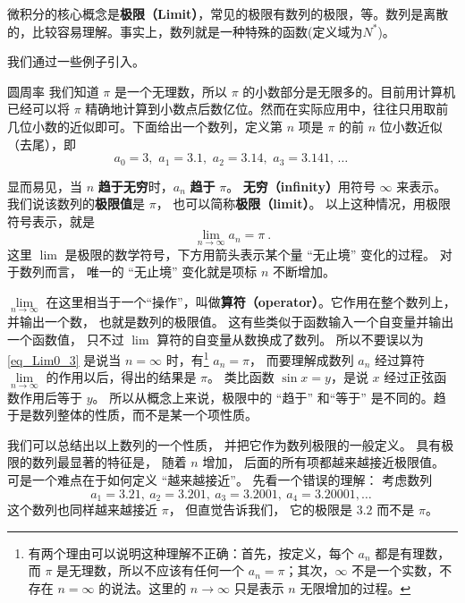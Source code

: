 
微积分的核心概念是\textbf{极限（Limit）}，常见的极限有数列的极限，等。数列是离散的，比较容易理解。事实上，数列就是一种特殊的函数(定义域为$N^{*}$)。

我们通过一些例子引入。

\begin{example}{圆周率}\label{ex_Lim0_1}
我们知道 $\pi$ 是一个无理数，所以 $\pi$ 的小数部分是无限多的。目前用计算机已经可以将 $\pi$ 精确地计算到小数点后数亿位。然而在实际应用中，往往只用取前几位小数的近似即可。下面给出一个数列，定义第 $n$ 项是 $\pi$ 的前 $n$ 位小数近似（去尾），即
\begin{equation}\label{eq_Lim0_1}
a_0 = 3,\,\, a_1 = 3.1,\,\, a_2 = 3.14,\,\, a_3 = 3.141,\,\dots~
\end{equation}

显而易见，当 $n$ \textbf{趋于无穷}时，$a_n$ \textbf{趋于} $\pi$。 \textbf{无穷（infinity）}用符号 $\infty$ 来表示。 我们说该数列的\textbf{极限值}是 $\pi$， 也可以简称\textbf{极限（limit）}。 以上这种情况，用极限符号表示，就是
\begin{equation}\label{eq_Lim0_3}
\lim_{n \to \infty } {a_n} = \pi ~.
\end{equation}
这里 $\lim$ 是极限的数学符号，下方用箭头表示某个量 “无止境” 变化的过程。 对于数列而言， 唯一的 “无止境” 变化就是项标 $n$ 不断增加。%
\end{example}



$\lim\limits_{n \to \infty }$ 在这里相当于一个“操作”，叫做\textbf{算符（operator）}。它作用在整个数列上，并输出一个数， 也就是数列的极限值。 这有些类似于函数输入一个自变量并输出一个函数值， 只不过 $\lim$ 算符的自变量从数换成了数列。 所以不要误以为\autoref{eq_Lim0_3} 是说当 $n = \infty$ 时，有\footnote{有两个理由可以说明这种理解不正确：首先，按定义，每个 $a_n$ 都是有理数，而 $\pi$ 是无理数，所以不应该有任何一个 $a_n=\pi$；其次，$\infty$ 不是一个实数，不存在 $n=\infty$ 的说法。这里的 $n\to\infty$ 只是表示 $n$ 无限增加的过程。} $a_n=\pi$， 而要理解成数列 $a_n$ 经过算符 $\lim\limits_{n \to \infty }$ 的作用以后，得出的结果是 $\pi$。 类比函数 $\sin x = y$，是说 $x$ 经过正弦函数作用后等于 $y$。 所以从概念上来说，极限中的 “趋于” 和“等于” 是不同的。趋于是数列整体的性质，而不是某一个项性质。

我们可以总结出以上数列的一个性质， 并把它作为数列极限的一般定义。 具有极限的数列最显著的特征是， 随着 $n$ 增加， 后面的所有项都越来越接近极限值。 可是一个难点在于如何定义 “越来越接近”。 先看一个错误的理解： 考虑数列
\begin{equation}\label{eq_Lim0_2}
a_1 = 3.21,\ a_2 = 3.201,\ a_3 = 3.2001,\ a_4 = 3.20001, \dots~
\end{equation}
这个数列也同样越来越接近 $\pi$， 但直觉告诉我们， 它的极限是 $3.2$ 而不是 $\pi$。

